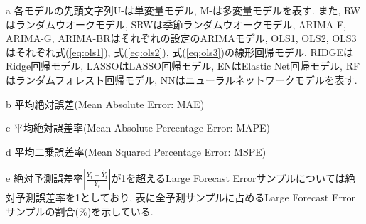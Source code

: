 \begin{threeparttable}[h]
\begin{tablenotes}
\item[a] 各モデルの先頭文字列U-は単変量モデル, M-は多変量モデルを表す. また, RWはランダムウオークモデル, SRWは季節ランダムウオークモデル, ARIMA-F, ARIMA-G, ARIMA-BRはそれぞれ\cite*{foster1977quarterly, griffin1977time, brown1979univariate}の設定のARIMAモデル, OLS1, OLS2, OLS3はそれぞれ式(\ref{eq:ols1}), 式(\ref{eq:ols2}), 式(\ref{eq:ols3})の線形回帰モデル, RIDGEはRidge回帰モデル, LASSOはLASSO回帰モデル, ENはElastic Net回帰モデル, RFはランダムフォレスト回帰モデル, NNはニューラルネットワークモデルを表す.
\item[b] 平均絶対誤差(Mean Absolute Error: MAE)
\item[c] 平均絶対誤差率(Mean Absolute Percentage Error: MAPE)
\item[d] 平均二乗誤差率(Mean Squared Percentage Error: MSPE)
\item[e] 絶対予測誤差率$\left| \frac{Y_t -{\hat Y}_t}{Y_t} \right|$が1を超えるLarge Forecast Errorサンプルについては絶対予測誤差率を1としており, 表に全予測サンプルに占めるLarge Forecast Errorサンプルの割合(\%)を示している.
\end{tablenotes}
\end{threeparttable}  